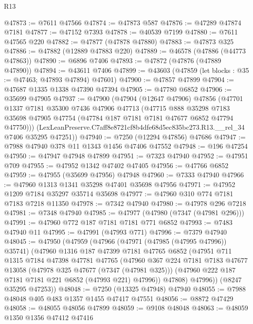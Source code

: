 \begin{lexlean}{R13}
\begin{coremodule}
@47873 := @7611 @47566
@47874 := @47873 @587
@47876 := @47289 @47874 @7181
@47877 := @47152 @7393
@47878 := @40539 @7199
@47880 := @7611 @47565 @220
@47882 := @47877 (@47878 @47880)
@47883 := @47873 @325
@47886 := @47882 (@12889 @47883 @220)
@47889 := @46578 (@47886 (@44773 @47863))
@47890 := @6896 @7406
@47893 := @47872 (@47876 (@47889 @47890))
@47894 := @43611 @7406
@47899 := @43603 (@47859 (let blocks : @35 := @47463; @47893 @47894) @47601)
@47900 := @47857 @47899
@47904 := @47687 @1335 @1338 @47390 @47394
@47905 := @47780 @6852
@47906 := @35699 @47905
@47937 := @47900
    (@47904
      (@12647 @47906)
      @47856
      (@47701
        @1337
        @7181
        @35300
        @7436
        @47906
        @47713
        (@47715
          @888
          @35298
          @7183
          @35698
          @47905
          @47754
          (@47784 @187 @7181 @7181 @47677 @6852 @47794 @47750)))
      (LexLeanPreserve.C7aff8e8721cf8b4dfe68d5ec835bc273.R13.__rel_34 @7406 @35295 @47251))
@47940 := @7250 (@12294 @47856) @47686
@47947 := @7988 @47940 @378 @11 @1343 @1456 @47406 @47552
@47948 := @196 @47254
@47950 := @47947 @47948 @47899
@47951 := @7323 @47940
@47952 := @47951 @709
@47955 := @47952 @1342 @47402 @47405
@47956 := @47766 @6852
@47959 := @47955 (@35699 @47956) @47948
@47960 := @7333 @47940
@47966 := @47960 @1313 @1341 @35298 @47401 @35698 @47956
@47971 := @47952 @1209 @7184 @35297 @35714 @35698
@47977 := @47960 @310 @774 @7181 @7183 @7218 @11350
@47978 := @7342 @47940
@47980 := @47978 @296 @7218
@47981 := @7348 @47940
@47985 := @47977 (@47980 (@7347 (@47981 @296)))
@47991 := @47960 @772 @187 @7181 @7181 @771 @6852
@47993 := @7483 @47940 @11
@47995 := @47991 (@47993 @771)
@47996 := @7379 @47940
@48045 := @47950
    (@47959
      (@47966
        (@47971 (@47985 (@47995 @47996)) @35741)
        (@47960
          @1316
          @187
          @47399
          @7181
          @47765
          @6852
          (@47951
            @711
            @1315
            @7184
            @47398
            @47781
            @47765
            (@47960
              @367
              @224
              @7181
              @7183
              @47677
              @13058
              (@47978 @325 @47677 (@7347 (@47981 @325)))
              (@47960 @222 @187 @7181 @7181 @221 @6852 (@47993 @221) @47996))
            @47808)
          @47996))
      (@8247 @35295 @47253))
@48048 := @7250 (@13325 @47948) @47940
@48055 := @7988 @48048 @405 @483 @1357 @1455 @47417 @47551
@48056 := @8872 @47429
@48058 := @48055 @48056 @47899
@48059 := @9108 @48048
@48063 := @48059 @1350 @1356 @47412 @47416

\end{coremodule}
\end{lexlean}
